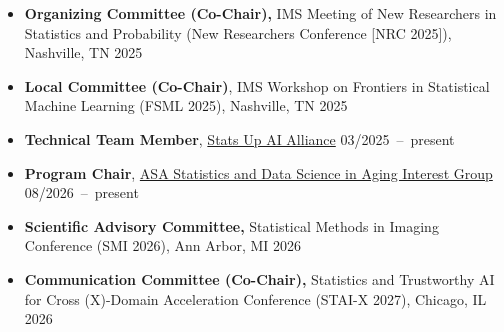 \documentclass[12pt,letterpaper]{article}
\newenvironment{cventry}{\begin{minipage}[t]{\linewidth}}{\end{minipage}}
\begin{document}
\begin{itemize}
\begin{cventry} {\bf Scientific Program Committee,}
		Applied Statistics Symposium, Storrs, CT \hfill \mbox{2025}
		\par\end{cventry}
		\item\begin{cventry} {\bf Organizing Committee (Co-Chair),} IMS Meeting of 
		New Researchers in Statistics and Probability (New 
		Researchers Conference [NRC 2025]), Nashville, TN \hfill 
		2025
		\par\end{cventry}
		\item\begin{cventry} {\bf Local Committee (Co-Chair)}, IMS Workshop on 
		Frontiers in Statistical Machine Learning (FSML 2025), 
		Nashville, TN \hfill 2025
		\par\end{cventry}
		\item\begin{cventry} {\bf Technical Team Member}, 
		\href{https://statsupai.org/}{Stats Up AI Alliance} \hfill 
		\mbox{03/2025 -- present}
		\par\end{cventry}
		\item\begin{cventry} {\bf Program Chair}, 
		\href{https://sdsaamstat.github.io/SDSA_website/}{ASA 
		Statistics and Data Science in Aging Interest Group} 
		\hfill {\mbox{08/2026 -- present}}
		\par\end{cventry}
		\item\begin{cventry} {\bf Scientific Advisory Committee,} Statistical 
		Methods in Imaging Conference (SMI 2026), Ann Arbor, MI 
		\hfill \mbox{2026}
		\par\end{cventry}
		\item\begin{cventry} {\bf Communication Committee 
		(Co-Chair),} Statistics and Trustworthy AI for Cross 
		(X)-Domain Acceleration Conference (STAI-X 2027), Chicago, 
		IL \hfill \mbox{2026}
		\par\end{cventry}
	\end{itemize}
	
\end{document}
